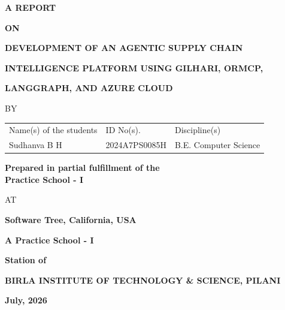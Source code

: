 \documentclass{book}
\begin{document}


\large

\thispagestyle{empty}
\centerline{\bf A REPORT}
\vspace*{0.3cm}
\centerline{\bf ON}
\vspace*{0.3cm}
\centerline{\bf DEVELOPMENT OF AN AGENTIC SUPPLY CHAIN}
\centerline{\bf INTELLIGENCE PLATFORM USING GILHARI, ORMCP,}
\centerline{\bf LANGGRAPH, AND AZURE CLOUD}
\vspace*{2cm}

\centerline{BY}
\vspace*{1cm}

\begin{center}
	\begin{tabular}{lll}
		Name(s) of the students & \hspace*{2cm} ID No(s). & \hspace*{2cm} Discipline(s) \\
		Sudhanva B H &\hspace*{2cm} 2024A7PS0085H &\hspace*{2cm} B.E. Computer Science \\
	\end{tabular}
\end{center}

\vspace*{2cm}
\begin{center}
	{\bf Prepared in partial fulfillment of the \\
	Practice School - I} \\
\end{center}

\vspace*{0.5cm}

\centerline{AT}

\vspace*{1cm}
        \centerline{\bf Software Tree, California, USA}
	\vspace{0.2cm}
	\centerline{\bf A Practice School - I}
	\vspace{0.2cm}
	\centerline{\bf Station of}
	\vspace{0.5cm}
\begin{figure}[ht]
\epsfxsize=1.0in
\centerline{}
\end{figure}

	\centerline{\bf BIRLA INSTITUTE OF TECHNOLOGY \& SCIENCE, PILANI}
	\vspace*{0.5cm}
	\centerline{\bf July, 2026}
	\newpage
\end{document}
